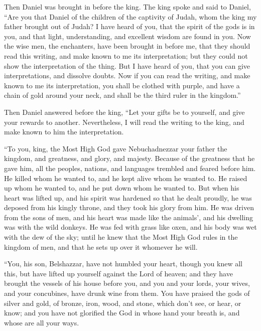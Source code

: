 {\par }{\PP {}Then Daniel was brought in before the king. The king spoke and said to Daniel, “Are you that Daniel of the children of the captivity of Judah, whom the king my father brought out of Judah?
I have heard of you, that the spirit of the gods is in you, and that light, understanding, and excellent wisdom are found in you.
Now the wise men, the enchanters, have been brought in before me, that they should read this writing, and make known to me its interpretation; but they could not show the interpretation of the thing.
But I have heard of you, that you can give interpretations, and dissolve doubts. Now if you can read the writing, and make known to me its interpretation, you shall be clothed with purple, and have a chain of gold around your neck, and shall be the third ruler in the kingdom.”
\par }{\PP {}Then Daniel answered before the king, “Let your gifts be to yourself, and give your rewards to another. Nevertheless, I will read the writing to the king, and make known to him the interpretation.
\par }{\PP {}“To you, king, the Most High God gave Nebuchadnezzar your father the kingdom, and greatness, and glory, and majesty.
Because of the greatness that he gave him, all the peoples, nations, and languages trembled and feared before him. He killed whom he wanted to, and he kept alive whom he wanted to. He raised up whom he wanted to, and he put down whom he wanted to.
But when his heart was lifted up, and his spirit was hardened so that he dealt proudly, he was deposed from his kingly throne, and they took his glory from him.
He was driven from the sons of men, and his heart was made like the animals’, and his dwelling was with the wild donkeys. He was fed with grass like oxen, and his body was wet with the dew of the sky; until he knew that the Most High God rules in the kingdom of men, and that he sets up over it whomever he will.
\par }{\PP {}“You, his son, Belshazzar, have not humbled your heart, though you knew all this,
but have lifted up yourself against the Lord of heaven; and they have brought the vessels of his house before you, and you and your lords, your wives, and your concubines, have drunk wine from them. You have praised the gods of silver and gold, of bronze, iron, wood, and stone, which don’t see, or hear, or know; and you have not glorified the God in whose hand your breath is, and whose are all your ways.
}

